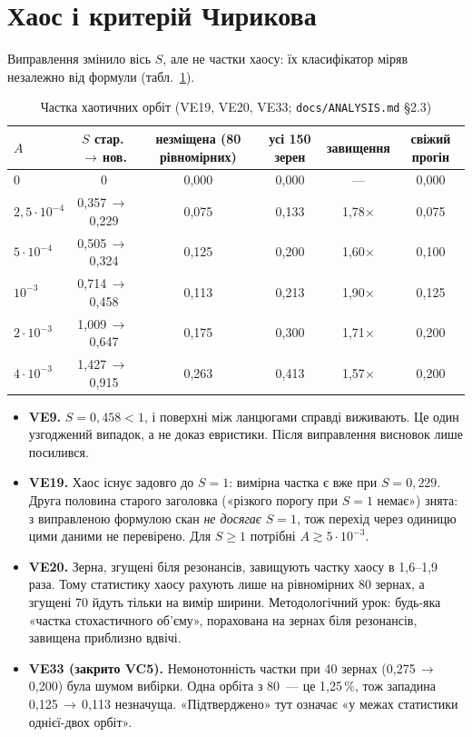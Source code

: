 \section{Хаос і критерій Чирикова}\label{sec:g08-chirikov}

Виправлення змінило вісь $S$, але не частки хаосу: їх класифікатор міряв незалежно від формули
(табл.~\ref{tab:g08-chaos}).

\begin{table}[ht]
\centering\small
\caption{Частка хаотичних орбіт (VE19, VE20, VE33; \texttt{docs/ANALYSIS.md} §2.3)}
\label{tab:g08-chaos}
\begin{tabular}{@{}lccccc@{}}
\toprule
$A$ & $S$ стар.\,$\to$\,нов. & незміщена (80 рівномірних) & усі 150 зерен & завищення & свіжий прогін\\
\midrule
0 & 0 & 0,000 & 0,000 & --- & 0,000\\
$2{,}5\cdot10^{-4}$ & 0,357\,$\to$\,0,229 & 0,075 & 0,133 & 1,78$\times$ & 0,075\\
$5\cdot10^{-4}$ & 0,505\,$\to$\,0,324 & 0,125 & 0,200 & 1,60$\times$ & 0,100\\
$10^{-3}$ & 0,714\,$\to$\,0,458 & 0,113 & 0,213 & 1,90$\times$ & 0,125\\
$2\cdot10^{-3}$ & 1,009\,$\to$\,0,647 & 0,175 & 0,300 & 1,71$\times$ & 0,200\\
$4\cdot10^{-3}$ & 1,427\,$\to$\,0,915 & 0,263 & 0,413 & 1,57$\times$ & 0,200\\
\bottomrule
\end{tabular}
\end{table}

\begin{itemize}
\item \textbf{VE9.} $S=0{,}458<1$, і поверхні між ланцюгами справді виживають. Це один
      узгоджений випадок, а не доказ евристики. Після виправлення висновок лише посилився.
\item \textbf{VE19.} Хаос існує задовго до $S=1$: вимірна частка є вже при $S=0{,}229$. Друга
      половина старого заголовка («різкого порогу при $S=1$ немає») знята: з виправленою формулою
      скан \emph{не досягає} $S=1$, тож перехід через одиницю цими даними не перевірено. Для
      $S\ge1$ потрібні $A\gtrsim5\cdot10^{-3}$.
\item \textbf{VE20.} Зерна, згущені біля резонансів, завищують частку хаосу в 1,6--1,9 раза.
      Тому статистику хаосу рахують лише на рівномірних 80 зернах, а згущені 70 йдуть тільки на
      вимір ширини. Методологічний урок: будь-яка «частка стохастичного об'єму», порахована на
      зернах біля резонансів, завищена приблизно вдвічі.
\item \textbf{VE33 (закрито VC5).} Немонотонність частки при 40 зернах (0,275\,$\to$\,0,200) була
      шумом вибірки. Одна орбіта з 80~--- це 1,25\,\%, тож западина 0,125\,$\to$\,0,113 незначуща.
      «Підтверджено» тут означає «у межах статистики однієї-двох орбіт».
\end{itemize}

